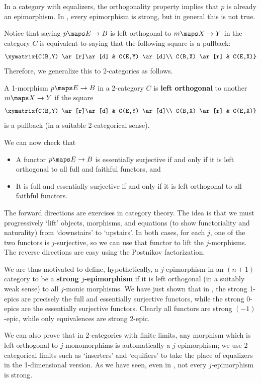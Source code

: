 \documentclass{amsart}
\begin{document}
In a category with equalizers, the orthogonality property implies that
$p$ is already an epimorphism.  In \Set, every epimorphism is strong,
but in general this is not true.

Notice that saying $p\maps E\to B$ is left orthogonal to $m\maps X\to
Y$ in the category $C$ is equivalent to saying that the following
square is a pullback:
\[\xymatrix{C(B,Y) \ar[r]\ar[d] & C(E,Y) \ar[d]\\
  C(B,X) \ar[r] & C(E,X)}\]
Therefore, we generalize this to 2-categories as follows.

\begin{defn}
  A 1-morphism $p\maps E\to B$ in a 2-category $C$ is \textbf{left
    orthogonal} to another $m\maps X\to Y$ if the square
  \[\xymatrix{C(B,Y) \ar[r]\ar[d] & C(E,Y) \ar[d]\\
    C(B,X) \ar[r] & C(E,X)}\]
  is a pullback (in a suitable 2-categorical sense).
\end{defn}

We can now check that
\begin{itemize}
\item A functor $p\maps E\to B$ is essentially surjective if and only
  if it is left orthogonal to all full and faithful functors, and
\item It is full and essentially surjective if and only if it is left
  orthogonal to all faithful functors.
\end{itemize}

The forward directions are exercises in category theory.  The idea is
that we must progressively `lift' objects, morphisms, and equations
(to show functoriality and naturality) from `downstairs' to
`upstairs'.  In both cases, for each $j$, one of the two functors is
$j$-surjective, so we can use that functor to lift the $j$-morphisms.
The reverse directions are easy using the Postnikov factorization.

We are thus motivated to define, hypothetically, a $j$-epimorphism in
an $(n+1)$-category to be a \textbf{strong $j$-epimorphism} if it is
left orthogonal (in a suitably weak sense) to all $j$-monic morphisms.
We have just shown that in \Cat, the strong 1-epics are precisely the
full and essentially surjective functors, while the strong 0-epics are
the essentially surjective functors.  Clearly all functors are strong
$(-1)$-epic, while only equivalences are strong 2-epic.

We can also prove that in 2-categories with finite limits, any
morphism which is left orthogonal to $j$-monomorphims is automatically
a $j$-epimorphism; we use 2-categorical limits such as `inserters' and
`equifiers' to take the place of equalizers in the 1-dimensional
version.  As we have seen, even in \Cat, not every $j$-epimorphism is
strong.
\end{document}
